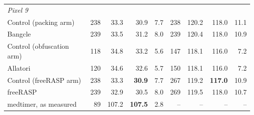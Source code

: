 \begin{table}[t]
\begin{tabular}{lrrrrrrrr}
\midrule
\multicolumn{9}{l}{\textit{Pixel 9}} \\
Control (packing arm) & 238 & 33.3 & 30.9 & 7.7 & 238 & 120.2 & 118.0 & 11.1 \\
Bangcle & 239 & 33.5 & 31.2 & 8.0 & 239 & 120.4 & 118.0 & 10.9 \\
Control (obfuscation arm) & 118 & 34.8 & 33.2 & 5.6 & 147 & 118.1 & 116.0 & 7.2 \\
Allatori & 120 & 34.6 & 32.6 & 5.7 & 150 & 118.1 & 116.0 & 7.2 \\
Control (freeRASP arm) & 238 & 33.3 & \textbf{30.9} & 7.7 & 267 & 119.2 & \textbf{117.0} & 10.9 \\
freeRASP & 239 & 32.9 & 30.5 & 8.0 & 269 & 119.5 & 118.0 & 10.7 \\
medtimer, as measured & 89 & 107.2 & \textbf{107.5} & 2.8 & – & – & – & – \\
\bottomrule
\end{tabular}
\end{table}
